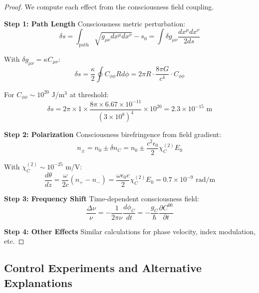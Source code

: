 \documentclass[11pt]{article}
\theoremstyle{definition}
\begin{document}
\begin{proof}
We compute each effect from the consciousness field coupling.

\textbf{Step 1: Path Length}
Consciousness metric perturbation:
\begin{equation}
\delta s = \int_{\text{path}} \sqrt{g_{\mu\nu}dx^\mu dx^\nu} - s_0 = \int \delta g_{\mu\nu} \frac{dx^\mu dx^\nu}{2ds}
\end{equation}

With $\delta g_{\mu\nu} = \kappa C_{\mu\nu}$:
\begin{equation}
\delta s = \frac{\kappa}{2} \oint C_{\phi\phi} R d\phi = 2\pi R \cdot \frac{8\pi G}{c^4} \cdot C_{\phi\phi}
\end{equation}

For $C_{\phi\phi} \sim 10^{20}$ J/m$^3$ at threshold:
\begin{equation}
\delta s = 2\pi \times 1 \times \frac{8\pi \times 6.67 \times 10^{-11}}{(3 \times 10^8)^4} \times 10^{20} = 2.3 \times 10^{-15} \text{ m}
\end{equation}

\textbf{Step 2: Polarization}
Consciousness birefringence from field gradient:
\begin{equation}
n_\pm = n_0 \pm \delta n_C = n_0 \pm \frac{c^2 \epsilon_0}{2} \chi^{(2)}_{C} E_0
\end{equation}

With $\chi^{(2)}_C \sim 10^{-25}$ m/V:
\begin{equation}
\frac{d\theta}{dz} = \frac{\omega}{2c}(n_+ - n_-) = \frac{\omega \epsilon_0 c}{2} \chi^{(2)}_C E_0 = 0.7 \times 10^{-9} \text{ rad/m}
\end{equation}

\textbf{Step 3: Frequency Shift}
Time-dependent consciousness field:
\begin{equation}
\frac{\Delta\nu}{\nu} = -\frac{1}{2\pi\nu} \frac{d\phi_C}{dt} = -\frac{g_C}{\hbar} \frac{\partial C^{00}}{\partial t}
\end{equation}

\textbf{Step 4: Other Effects}
Similar calculations for phase velocity, index modulation, etc.
\end{proof}

\subsection{Control Experiments and Alternative Explanations}
\end{document}
